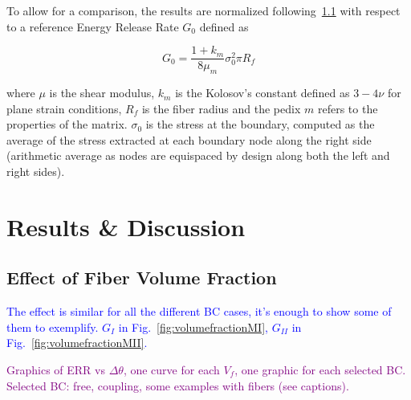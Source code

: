 \documentclass[review]{elsarticle}
\begin{document}
To allow for a comparison, the results are normalized following~\ref{} with respect to a reference Energy Release Rate $G_{0}$ defined as

\begin{equation}
G_{0}=\frac{1+k_{m}}{8\mu_{m}}\sigma_{0}^{2}\pi R_{f}
\end{equation}

where $\mu$ is the shear modulus, $k_{m}$ is the Kolosov's constant defined as $3-4\nu$ for plane strain conditions, $R_{f}$ is the fiber radius and the pedix $m$ refers to the properties of the matrix. $\sigma_{0}$ is the stress at the boundary, computed as the average of the stress extracted at each boundary node along the right side (arithmetic average as nodes are equispaced by design along both the left and right sides).

\section{Results \& Discussion}

\subsection{Effect of Fiber Volume Fraction}

\textcolor{blue}{The effect is similar for all the different BC cases, it's enough to show some of them to exemplify. $G_{I}$ in Fig.~\ref{fig:volumefractionMI}, $G_{II}$ in Fig.~\ref{fig:volumefractionMII}.}

\textcolor{purple}{Graphics of ERR vs $\Delta\theta$, one curve for each $V_{f}$, one graphic for each selected BC. Selected BC: free, coupling, some examples with fibers (see captions).}
\end{document}
